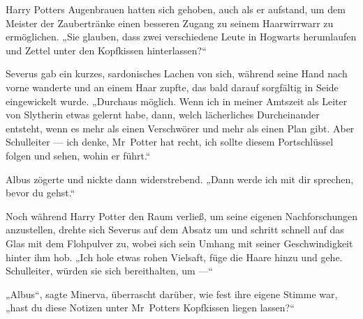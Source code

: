 Harry Potters Augenbrauen hatten sich gehoben, auch als er aufstand, um dem Meister der Zaubertränke einen besseren Zugang zu seinem Haarwirrwarr zu ermöglichen.
„Sie glauben, dass zwei verschiedene Leute in Hogwarts herumlaufen und Zettel unter den Kopfkissen hinterlassen?“

Severus gab ein kurzes, sardonisches Lachen von sich, während seine Hand nach vorne wanderte und an einem Haar zupfte, das bald darauf sorgfältig in Seide eingewickelt wurde.
„Durchaus möglich. Wenn ich in meiner Amtszeit als Leiter von Slytherin etwas gelernt habe, dann, welch lächerliches Durcheinander entsteht, wenn es mehr als einen Verschwörer und mehr als einen Plan gibt. Aber Schulleiter — ich denke, Mr~Potter hat recht, ich sollte diesem Portschlüssel folgen und sehen, wohin er führt.“

Albus zögerte und nickte dann widerstrebend.
„Dann werde ich mit dir sprechen, bevor du gehst.“

\later

Noch während Harry Potter den Raum verließ, um seine eigenen Nachforschungen anzustellen, drehte sich Severus auf dem Absatz um und schritt schnell auf das Glas mit dem Flohpulver zu, wobei sich sein Umhang mit seiner Geschwindigkeit hinter ihm hob.
„Ich hole etwas rohen Vielsaft, füge die Haare hinzu und gehe. Schulleiter, würden sie sich bereithalten, um —“

„Albus“, sagte Minerva, überrascht darüber, wie fest ihre eigene Stimme war, „hast du diese Notizen unter Mr~Potters Kopfkissen liegen lassen?“

